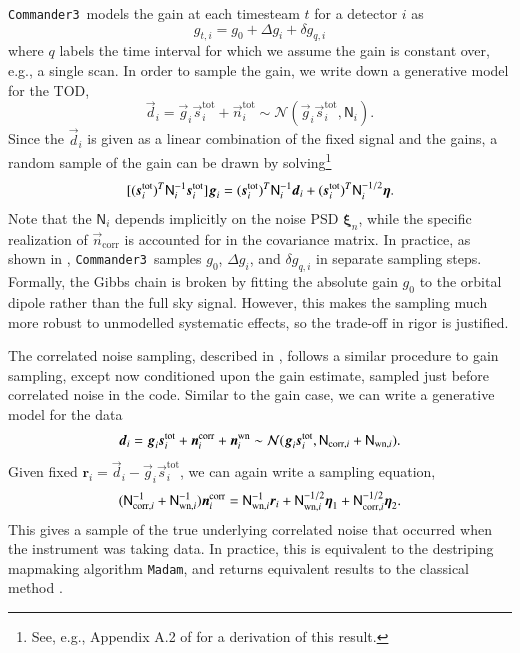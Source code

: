 \documentclass[twocolumn]{../../common/aa}
\def\commanderthree{\texttt{Commander3}}
\renewcommand{\d}[0]{\vec{d}}
\newcommand{\n}[0]{\vec{n}}
\newcommand{\s}[0]{\vec{s}}
\newcommand{\g}[0]{\vec{g}}
\newcommand{\N}[0]{\tens{N}}
\newcommand{\ncorr}{\vec n_\mathrm{corr}}
\begin{document}
\commanderthree\ models the gain at each timesteam $t$ for a detector $i$ as
\begin{equation}
	g_{t,i}=g_0+\Delta g_i+\delta g_{q,i}
\end{equation}
where $q$ labels the time interval for which we assume the gain is constant over, e.g., a single scan. In order to sample the gain, we write down a generative model for the TOD,
\begin{equation}
	\d_i=\g_{i}\s_{i}^\mathrm{tot} +\n_{i}^\mathrm{tot}\sim\mathcal N(\g_i\s_{i}^\mathrm{tot},\mathsf N_i).
\end{equation}
Since the $\d_i$ is given as a linear combination of the fixed signal and the gains, a random sample of the gain can be drawn by solving\footnote{See, e.g., Appendix A.2 of \citet{bp01} for a derivation of this result.}
\begin{equation}
	\label{eq:gain_gauss_samp}
	[(\s_i^\mathrm{tot})^T\mathsf N_i^{-1}\s_i^\mathrm{tot}]\g_i
	=(\s_i^\mathrm{tot})^T\N^{-1}_i\d_i
	+(\s_i^\mathrm{tot})^T\N^{-1/2}_i\boldsymbol\eta.
\end{equation}
Note that the $\mathsf N_i$ depends implicitly on the noise PSD $\boldsymbol \xi_n$, while the specific realization of $\ncorr$ is accounted for in the covariance matrix.
In practice, as shown in \citet{bp07}, \commanderthree\ samples $g_0$, $\Delta g_i$, and $\delta g_{q,i}$ in separate sampling steps. Formally, the Gibbs chain is broken by fitting the absolute gain $g_0$ to the orbital dipole rather than the full sky signal. However, this makes the sampling much more robust to unmodelled systematic effects, so the trade-off in rigor is justified.

The correlated noise sampling, described in \citet{bp06}, follows a similar procedure to gain sampling, except now conditioned upon the gain estimate, sampled just before correlated noise in the code. Similar to the gain case, we can write a generative model for the data
\begin{equation}
	\d_i=\g_i\s_i^\mathrm{tot}+\n_i^\mathrm{corr}+\n^\mathrm{wn}_i
	\sim\mathcal N(\g_i\s_i^\mathrm{tot},\N_{\mathrm{corr},i}+\N_{\mathrm{wn},i}).
\end{equation}
Given fixed $\boldsymbol r_i=\d_i-\g_i\s_i^\mathrm{tot}$, we can again write a sampling equation, 
\begin{equation}
	\label{eq:ncorr_gauss_samp}
	(\N_{\mathrm{corr},i}^{-1}+\N_{\mathrm{wn},i}^{-1})
	\n^\mathrm{corr}_i
	=\N^{-1}_{\mathrm{wn},i}\boldsymbol r_i
	+\N^{-1/2}_{\mathrm{wn},i}\boldsymbol\eta_1
	+\N^{-1/2}_{\mathrm{corr},i}\boldsymbol\eta_2.
\end{equation}
This gives a sample of the true underlying correlated noise that occurred when the instrument was taking data. In practice, this is equivalent to the destriping mapmaking algorithm \texttt{Madam}, and returns equivalent results to the classical method \citep{bp02}.
\end{document}

